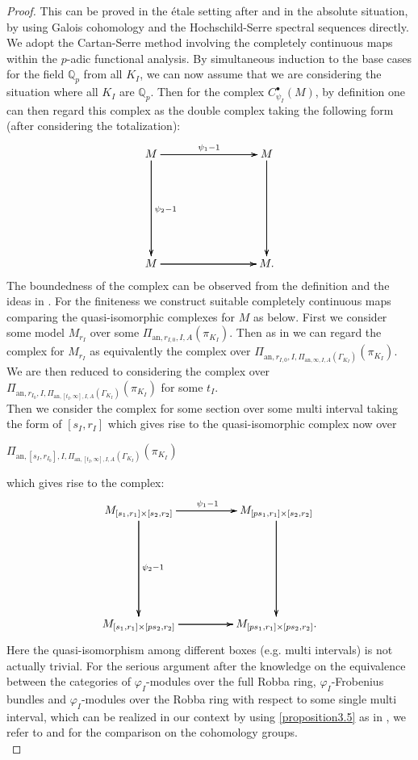 \documentclass[12pt]{amsart}
\theoremstyle{definition}
\numberwithin{equation}{section}
\begin{document}
\begin{proof}
This can be proved in the \'etale setting after \cite{PZ19} and \cite{CKZ18} in the absolute situation, by using Galois cohomology and the Hochschild-Serre spectral sequences directly. We adopt the Cartan-Serre method involving the completely continuous maps within the $p$-adic functional analysis. By simultaneous induction to the base cases for the field $\mathbb{Q}_p$ from all $K_I$, we can now assume that we are considering the situation where all $K_I$ are $\mathbb{Q}_p$. Then for the complex $C^\bullet_{\psi_I}(M)$, by definition one can then regard this complex as the double complex taking the following form (after considering the  totalization):
\[
\xymatrix@R+5pc@C+5pc{
M \ar[r]^{\psi_1-1} \ar[r] \ar[r] \ar[d]^{\psi_2-1} \ar[d] \ar[d] & M \ar[d] \ar[d] \ar[d]\\
M \ar[r] \ar[r] \ar[r]  & M. 
}
\]
\indent The boundedness of the complex can be observed from the definition and the ideas in \cite[Theorem 3.3, Theorem 3.5]{KL3}. For the finiteness we construct suitable completely continuous maps comparing the quasi-isomorphic complexes for $M$ as below. First we consider some model $M_{r_I}$ over some $\Pi_{\mathrm{an},r_{I,0},I,A}(\pi_{K_I})$. Then as in \cite[Theorem 3.3, Theorem 3.5]{KL3} we can regard the complex for $M_{r_I}$ as equivalently the  complex over $\Pi_{\mathrm{an},r_{I,0},I,\Pi_{\mathrm{an},\infty,I,A}(\Gamma_{K_I})}(\pi_{K_I})$. We are then reduced to considering the complex over $\Pi_{\mathrm{an},r_{I_0},I,\Pi_{\mathrm{an},[t_I,\infty],I,A}(\Gamma_{K_I})}(\pi_{K_I})$ for some $t_I$.\\
\indent Then we consider the complex for some section over some multi interval taking the form of $[s_I,r_I]$ which gives rise to the quasi-isomorphic complex now over 
\begin{center}
$\Pi_{\mathrm{an},[s_I,r_{I_0}],I,\Pi_{\mathrm{an},[t_I,\infty],I,A}(\Gamma_{K_I})}(\pi_{K_I})$ 
\end{center}
which gives rise to the complex:
\[
\xymatrix@R+5pc@C+2pc{
M_{[s_1,r_1]\times[s_2,r_2]} \ar[r]^{\psi_1-1} \ar[r] \ar[r] \ar[d]^{\psi_2-1} \ar[d] \ar[d] & M_{[ps_1,r_1]\times[s_2,r_2]} \ar[d] \ar[d] \ar[d]\\
M_{[s_1,r_1]\times[ps_2,r_2]}\ar[r] \ar[r] \ar[r]  & M_{[ps_1,r_1]\times[ps_2,r_2]}. 
}
\]
Here the quasi-isomorphism among different boxes (e.g. multi intervals) is not actually trivial. For the serious argument after the knowledge on the equivalence between the categories of $\varphi_I$-modules over the full Robba ring, $\varphi_I$-Frobenius bundles and $\varphi_I$-modules over the Robba ring with respect to some single multi interval, which can be realized in our context by using \cref{proposition3.5} as in \cite[Lemma 2.10]{KP1}, we refer to \cite[Lemma 5.2]{KP1} and \cite[Proposition 5.12, Theorem 5.7.11]{KL2} for the comparison on the cohomology groups. \\

\end{proof}
\end{document}
